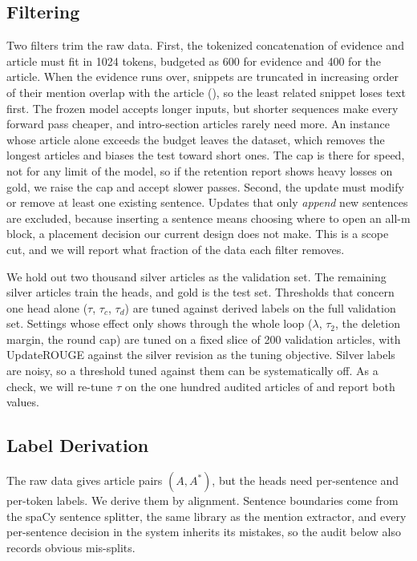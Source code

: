 \documentclass[]{paper}
\newcommand{\mask}{\ensuremath{\mathrm{m}}}
\begin{document}
\subsection{Filtering}
\label{sec:filtering}

Two filters trim the raw data. First, the tokenized concatenation of evidence and article must fit in 1024 tokens, budgeted as 600 for evidence and 400 for the article. When the evidence runs over, snippets are truncated in increasing order of their mention overlap with the article (), so the least related snippet loses text first. The frozen model accepts longer inputs, but shorter sequences make every forward pass cheaper, and intro-section articles rarely need more. An instance whose article alone exceeds the budget leaves the dataset, which removes the longest articles and biases the test toward short ones. The cap is there for speed, not for any limit of the model, so if the retention report shows heavy losses on gold, we raise the cap and accept slower passes. Second, the update must modify or remove at least one existing sentence. Updates that only \emph{append} new sentences are excluded, because inserting a sentence means choosing where to open an all-\mask{} block, a placement decision our current design does not make. This is a scope cut, and we will report what fraction of the data each filter removes.

We hold out two thousand silver articles as the validation set. The remaining silver articles train the heads, and gold is the test set. Thresholds that concern one head alone ($\tau$, $\tau_c$, $\tau_d$) are tuned against derived labels on the full validation set. Settings whose effect only shows through the whole loop ($\lambda$, $\tau_2$, the deletion margin, the round cap) are tuned on a fixed slice of 200 validation articles, with UpdateROUGE against the silver revision as the tuning objective. Silver labels are noisy, so a threshold tuned against them can be systematically off. As a check, we will re-tune $\tau$ on the one hundred audited articles of  and report both values.

\subsection{Label Derivation}
\label{sec:labels}

The raw data gives article pairs $(A, A^\ast)$, but the heads need per-sentence and per-token labels. We derive them by alignment. Sentence boundaries come from the spaCy sentence splitter, the same library as the mention extractor, and every per-sentence decision in the system inherits its mistakes, so the audit below also records obvious mis-splits.
\end{document}
